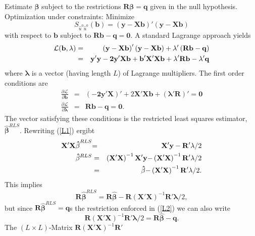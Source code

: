 \documentclass{article}
\begin{document}
Estimate $\mathbf{\beta }$  subject to the restrictions $\mathbf{R\beta }=\mathbf{q}$ 
 given in the null hypothesis. Optimization under constraints: Minimize
\[
S_{\hat{u}^{0}\hat{u}^{0}}(\mathbf{b})=\left( \mathbf{y}-\mathbf{Xb}\right)
'\left( \mathbf{y}-\mathbf{Xb}\right) 
\]
with respect to $\mathbf{b}$ subject to  $\mathbf{Rb-q}=\mathbf{0.}$
A standard Lagrange approach yields
\begin{eqnarray*}
\mathcal{L(}\mathbf{b},\mathbf{\lambda }) &=&\left( \mathbf{y}-\mathbf{Xb}%
\right) '\left( \mathbf{y}-\mathbf{Xb}\right) +\mathbf{\lambda }%
'\left( \mathbf{Rb-q}\right) \\
&=&\mathbf{y}'\mathbf{y-2y}'\mathbf{Xb+b}'\mathbf{%
X}'\mathbf{Xb+\lambda }'\mathbf{Rb}-\mathbf{\lambda }%
'\mathbf{q}
\end{eqnarray*}%
where $\mathbf{\lambda }$ is a vector (having length $L$) of Lagrange
multipliers. The first order conditions are
\begin{eqnarray}
\frac{\partial \mathcal{L}}{\partial \mathbf{b}} &=&\left( \mathbf{-2y}%
'\mathbf{X}\right) '+2\mathbf{X}'\mathbf{Xb+}%
\left( \mathbf{\mathbf{\lambda }'\mathbf{R}}\right) '%
\mathbf{=0}  \label{L1} \\
\frac{\partial \mathcal{L}}{\partial \mathbf{\lambda }} &=&\mathbf{Rb-q=0.}
\label{L2}
\end{eqnarray}
The vector satisfying these conditions is the restricted least squares
estimator, $\mathbf{\hat{\beta}}^{RLS}$. Rewriting (\ref{L1}) ergibt
\begin{eqnarray}
\mathbf{X}'\mathbf{X\mathbf{\hat{\beta}}}^{RLS} &\mathbf{=}&\mathbf{%
X'y-\mathbf{R}'\mathbf{\lambda }}/2  \nonumber \\
\mathbf{\mathbf{\hat{\beta}}}^{RLS} &=&\left( \mathbf{X}'\mathbf{X}%
\right) ^{-1}\mathbf{X'y-}\left( \mathbf{X}'\mathbf{X}%
\right) ^{-1}\mathbf{\mathbf{R}'\mathbf{\lambda }}/2  \nonumber \\
&=&\mathbf{\hat{\beta}-}\left( \mathbf{X}'\mathbf{X}\right) ^{-1}%
\mathbf{\mathbf{R}'\mathbf{\lambda }}/2.  \label{L3}
\end{eqnarray}%
This implies
\[ \mathbf{R\mathbf{\hat{\beta}}}^{RLS}=\mathbf{R\hat{\beta}-R}\left( \mathbf{X}%
'\mathbf{X}\right) ^{-1}\mathbf{\mathbf{R}'\mathbf{\lambda }}/2, \]
but since $\mathbf{R\mathbf{\hat{\beta}}}^{RLS}=\mathbf{q}$s the
restriction enforced in (\ref{L2}) we can also write
\[
\mathbf{R}\left( \mathbf{X}'\mathbf{X}\right) ^{-1}\mathbf{\mathbf{R%
}'\mathbf{\lambda }}/2=\mathbf{R\hat{\beta}-q.} 
\]
The $(L\times L)$-Matrix $\mathbf{R}(\mathbf{X}'\mathbf{X})^{-1}\mathbf{R}'$ 
\end{document}
